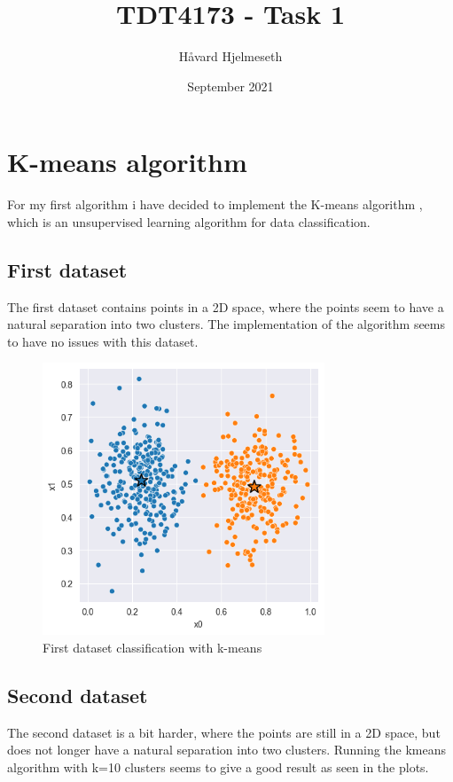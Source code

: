 \documentclass{article}
\title{TDT4173  - Task 1}
\author{Håvard Hjelmeseth}
\date{September 2021}
\begin{document}
\maketitle

\section{K-means algorithm}
For my first algorithm i have decided to implement the K-means algorithm
, which is an unsupervised learning algorithm for data classification.

\subsection{First dataset}
The first dataset contains points in a 2D space, where the points seem to have
a natural separation into two clusters. The implementation of the algorithm
seems to have no issues with this dataset.

\begin{figure}[!h]
    \centering
    \includegraphics[width=0.75\textwidth]{kmeans_data1.png}
    \caption{First dataset classification with k-means}
    \label{fig:dataset1}
\end{figure}

\subsection{Second dataset}

The second dataset is a bit harder, where the points are still in a 2D space,
but does not longer have a natural separation into two clusters. Running the kmeans
algorithm with k=10 clusters seems to give a good result as seen in the plots.
\end{document}
